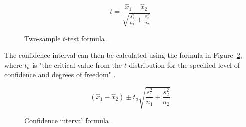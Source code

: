\begin{figure}[H]
    \[ t = \displaystyle\frac{\hat{x}_1-\hat{x}_2}{\displaystyle\sqrt{\frac{s^2_1}{n_1}+\frac{s^2_2}{n_2}}} \]
    \caption{Two-sample $t$-test formula \parencite{sauro_chapter5_2016}.}
    \label{fig:hsie-two-sample-t-test}
\end{figure}

The confidence interval can then be calculated using the formula in Figure~\ref{fig:hsie-confidence-interval-diff}, where $t_a$ is "the critical value from the $t$-distribution for the specified level of confidence and degrees of freedom" \parencite{sauro_chapter5_2016}.

\begin{figure}[H]
    \[ (\hat{x}_1-\hat{x}_2) \pm t_a\displaystyle\sqrt{\frac{s^2_1}{n_1}+\frac{s^2_2}{n_2}} \]
    \caption{Confidence interval formula \parencite{sauro_chapter5_2016}.}
    \label{fig:hsie-confidence-interval-diff}
\end{figure}
